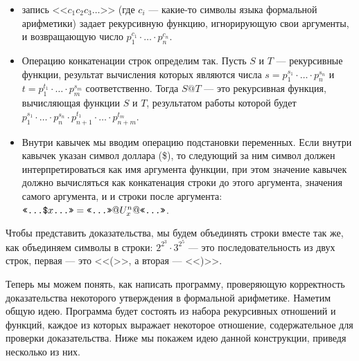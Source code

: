 \begin{itemize}
\item запись $\texttt{<<}c_1 c_2 c_3 \dots \texttt{>>}$ (где $c_i$ --- какие-то символы языка формальной арифметики)
задает рекурсивную функцию, игнорирующую свои аргументы, и возвращающую число $p_1^{c_1} \cdot \dots \cdot p_n^{c_n}$.

\item Операцию конкатенации строк определим так. Пусть $S$ и $T$ --- рекурсивные функции,
результат вычисления которых являются числа $s = p_1^{s_1} \cdot \dots \cdot p_n^{s_n}$ и
$t = p_1^{t_1} \cdot \dots \cdot p_m^{s_m}$ соответственно. 
Тогда $S @ T$ --- это рекурсивная функция, вычисляющая функции $S$ и $T$, 
результатом работы которой будет
$p_1^{s_1} \cdot \dots \cdot p_n^{s_n} \cdot p_{n+1}^{t_1} \cdot \dots \cdot p_{n+m}^{t_m}$.

\item Внутри кавычек мы вводим операцию подстановки переменных.
Если внутри кавычек указан символ доллара (\$), то следующий за ним символ
должен интерпретироваться как имя аргумента функции, при этом значение кавычек
должно вычисляться как конкатенация строки до этого аргумента, значения самого аргумента, и 
и строки после аргумента:
$\texttt{<<\dots \$} x \texttt{\dots >>} = \texttt{<<\dots>>} @ U^n_x @ \texttt{<<\dots>>}$.
\end{itemize}

Чтобы представить доказательства, мы будем объединять строки вместе так же, как
объединяем символы в строки: $2^{2^3} \cdot 3^{2^5}$ --- это последовательность
из двух строк, первая --- это <<(>>, а вторая --- <<)>>.

Теперь мы можем понять, как написать программу, проверяющую корректность доказательства 
некоторого утверждения в формальной арифметике. Наметим общую идею. Программа будет состоять из набора
рекурсивных отношений и функций, каждое из которых выражает некоторое 
отношение, содержательное для проверки доказательства. Ниже мы покажем идею 
данной конструкции, приведя несколько из них.

